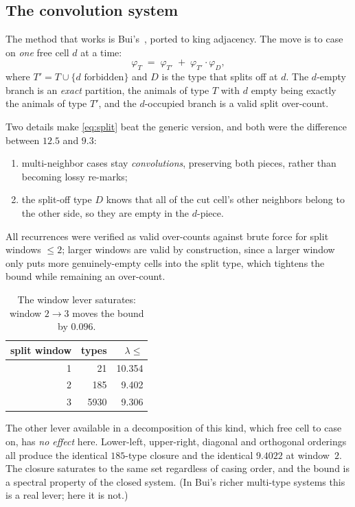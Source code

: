 \documentclass[11pt]{article}
\begin{document}
\subsection{The convolution system}
\label{sec:convolution}

The method that works is Bui's~\cite{bui2025}, ported to king adjacency. The
move is to case on \emph{one} free cell $d$ at a time:
\begin{equation}
  \varphi_T \;=\; \varphi_{T'} \;+\; \varphi_{T'}\cdot\varphi_{D},
  \label{eq:split}
\end{equation}
where $T' = T \cup \{d \text{ forbidden}\}$ and $D$ is the type that splits off at
$d$. The $d$-empty branch is an \emph{exact} partition, the animals of type $T$
with $d$ empty being exactly the animals of type $T'$, and the $d$-occupied
branch is a valid split over-count.

Two details make \eqref{eq:split} beat the generic version, and both
were the difference between $12.5$ and $9.3$:
\begin{enumerate}
\item multi-neighbor cases stay \emph{convolutions}, preserving both pieces,
  rather than becoming lossy re-marks;
\item the split-off type $D$ knows that all of the cut cell's other neighbors
  belong to the other side, so they are empty in the $d$-piece.
\end{enumerate}

All recurrences were verified as valid over-counts against brute force for split
windows $\le 2$; larger windows are valid by construction, since a larger window
only puts more genuinely-empty cells into the split type, which tightens the
bound while remaining an over-count.

\begin{table}[H]
\centering
\begin{tabular}{r r r}
\toprule
split window & types & $\lambda \le$ \\
\midrule
1 & 21   & 10.354 \\
2 & 185  & 9.402 \\
3 & 5930 & 9.306 \\
\bottomrule
\end{tabular}
\caption{The window lever saturates: window $2 \to 3$ moves the bound by
$0.096$.}
\label{tab:rd}
\end{table}

The other lever available in a decomposition of this kind, which free cell to
case on, has \emph{no effect} here. Lower-left, upper-right, diagonal
and orthogonal orderings all produce the identical $185$-type closure and the
identical $9.4022$ at window~$2$. The closure saturates to the same set
regardless of casing order, and the bound is a spectral property of the closed
system. (In Bui's richer multi-type systems this is a real lever; here it is
not.)
\end{document}
